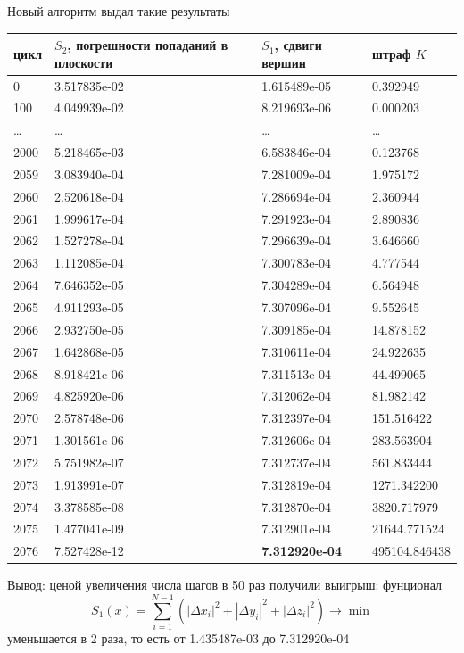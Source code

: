 \documentclass[a4paper,12pt, titlepage]{article}
\begin{document}
\begin{flushleft}
 Новый алгоритм выдал такие результаты
\end{flushleft}


\begin{flushleft}
 \begin{tabular}{|p{1cm}|p{5cm}|p{4cm}|p{3cm}|}
\hline
цикл & $S_{2}$, погрешности попаданий в плоскости & $S_{1}$, сдвиги вершин& штраф $K$ \\
  \hline
 0 & 3.517835e-02 & 1.615489e-05 & 0.392949\\
\hline
 100 & 4.049939e-02 & 8.219693e-06 & 0.000203\\
\hline
 \dots & \dots & \dots & \dots\\
\hline
 2000 & 5.218465e-03 & 6.583846e-04 & 0.123768\\
\hline
 2059 & 3.083940e-04 & 7.281009e-04 & 1.975172\\
\hline
 2060 & 2.520618e-04 & 7.286694e-04 & 2.360944\\
\hline
 2061 & 1.999617e-04 & 7.291923e-04 & 2.890836\\
\hline
 2062 & 1.527278e-04 & 7.296639e-04 & 3.646660\\
\hline
 2063 & 1.112085e-04 & 7.300783e-04 & 4.777544\\
\hline
 2064 & 7.646352e-05 & 7.304289e-04 & 6.564948\\
\hline
 2065 & 4.911293e-05 & 7.307096e-04 & 9.552645\\
\hline
 2066 & 2.932750e-05 & 7.309185e-04 & 14.878152\\
\hline
 2067 & 1.642868e-05 & 7.310611e-04 & 24.922635\\
\hline
 2068 & 8.918421e-06 & 7.311513e-04 & 44.499065\\
\hline
 2069 & 4.825920e-06 & 7.312062e-04 & 81.982142\\
\hline
 2070 & 2.578748e-06 & 7.312397e-04 & 151.516422\\
\hline
 2071 & 1.301561e-06 & 7.312606e-04 & 283.563904\\
\hline
 2072 & 5.751982e-07 & 7.312737e-04 & 561.833444\\
\hline
 2073 & 1.913991e-07 & 7.312819e-04 & 1271.342200\\
\hline
 2074 & 3.378585e-08 & 7.312870e-04 & 3820.717979\\
\hline
 2075 & 1.477041e-09 & 7.312901e-04 & 21644.771524\\
\hline
 2076 & 7.527428e-12 & \textbf{7.312920e-04} & 495104.846438\\
\hline
 \end{tabular}
\end{flushleft}
\begin{flushleft}
 Вывод: ценой увеличения числа шагов в 50 раз получили выигрыш: фунционал
$$	
	S_{1}(x) = \sum\limits_{i = 1}^{N - 1}(|\Delta x_{i}|^{2} + |\Delta y_{i}|^{2} + |\Delta z_{i}|^{2})\to \min		
$$
уменьшается в 2 раза, то есть от 1.435487e-03 до 7.312920e-04
\end{flushleft}
\end{document}
